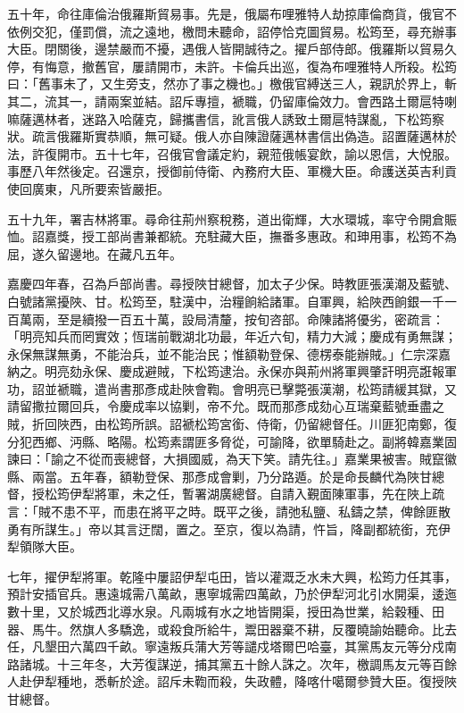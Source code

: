 \begin{pinyinscope}
五十年，命往庫倫治俄羅斯貿易事。先是，俄屬布哩雅特人劫掠庫倫商貨，俄官不依例交犯，僅罰償，流之遠地，檄問未聽命，詔停恰克圖貿易。松筠至，尋充辦事大臣。閉關後，邊禁嚴而不擾，遇俄人皆開誠待之。擢戶部侍郎。俄羅斯以貿易久停，有悔意，撤舊官，屢請開市，未許。卡倫兵出巡，復為布哩雅特人所殺。松筠曰：「舊事未了，又生旁支，然亦了事之機也。」檄俄官縛送三人，親訊於界上，斬其二，流其一，請兩案並結。詔斥專擅，褫職，仍留庫倫效力。會西路土爾扈特喇嘛薩邁林者，迷路入哈薩克，歸攜書信，訛言俄人誘致土爾扈特謀亂，下松筠察狀。疏言俄羅斯實恭順，無可疑。俄人亦自陳證薩邁林書信出偽造。詔置薩邁林於法，許復開市。五十七年，召俄官會議定約，親蒞俄帳宴飲，諭以恩信，大悅服。事歷八年然後定。召還京，授御前侍衛、內務府大臣、軍機大臣。命護送英吉利貢使回廣東，凡所要索皆嚴拒。

五十九年，署吉林將軍。尋命往荊州察稅務，道出衛輝，大水環城，率守令開倉賑恤。詔嘉獎，授工部尚書兼都統。充駐藏大臣，撫番多惠政。和珅用事，松筠不為屈，遂久留邊地。在藏凡五年。

嘉慶四年春，召為戶部尚書。尋授陜甘總督，加太子少保。時教匪張漢潮及藍號、白號諸黨擾陜、甘。松筠至，駐漢中，治糧餉給諸軍。自軍興，給陜西餉銀一千一百萬兩，至是續撥一百五十萬，設局清釐，按旬咨部。命陳諸將優劣，密疏言：「明亮知兵而罔實效；恆瑞前戰湖北功最，年近六旬，精力大減；慶成有勇無謀；永保無謀無勇，不能治兵，並不能治民；惟額勒登保、德楞泰能辦賊。」仁宗深嘉納之。明亮劾永保、慶成避賊，下松筠逮治。永保亦與荊州將軍興肇訐明亮誑報軍功，詔並褫職，遣尚書那彥成赴陜會鞫。會明亮已擊斃張漢潮，松筠請緩其獄，又請留撒拉爾回兵，令慶成率以協剿，帝不允。既而那彥成劾心互瑞棄藍號垂盡之賊，折回陜西，由松筠所誤。詔褫松筠宮銜、侍衛，仍留總督任。川匪犯南鄭，復分犯西鄉、沔縣、略陽。松筠素謂匪多脅從，可諭降，欲單騎赴之。副將韓嘉業固諫曰：「諭之不從而喪總督，大損國威，為天下笑。請先往。」嘉業果被害。賊竄徽縣、兩當。五年春，額勒登保、那彥成會剿，乃分路遁。於是命長麟代為陜甘總督，授松筠伊犁將軍，未之任，暫署湖廣總督。自請入覲面陳軍事，先在陜上疏言：「賊不患不平，而患在將平之時。既平之後，請弛私鹽、私鑄之禁，俾餘匪散勇有所謀生。」帝以其言迂闊，置之。至京，復以為請，忤旨，降副都統銜，充伊犁領隊大臣。

七年，擢伊犁將軍。乾隆中屢詔伊犁屯田，皆以灌溉乏水未大興，松筠力任其事，預計安插官兵。惠遠城需八萬畝，惠寧城需四萬畝，乃於伊犁河北引水開渠，逶迤數十里，又於城西北導水泉。凡兩城有水之地皆開渠，授田為世業，給穀種、田器、馬牛。然旗人多驕逸，或殺食所給牛，鬻田器棄不耕，反覆曉諭始聽命。比去任，凡墾田六萬四千畝。寧遠叛兵蒲大芳等譴戍塔爾巴哈臺，其黨馬友元等分戍南路諸城。十三年冬，大芳復謀逆，捕其黨五十餘人誅之。次年，檄調馬友元等百餘人赴伊犁種地，悉斬於途。詔斥未鞫而殺，失政體，降喀什噶爾參贊大臣。復授陜甘總督。


\end{pinyinscope}
